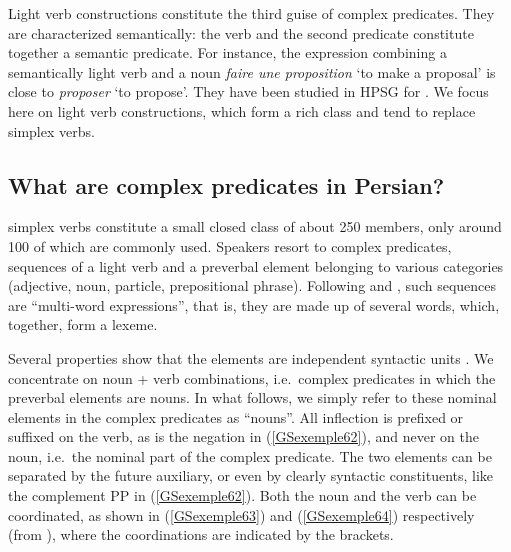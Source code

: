 Light verb constructions constitute the third guise of complex predicates. They are characterized semantically: the verb and the second predicate constitute together a semantic predicate. For instance, the  expression combining a semantically light verb and a noun \emph{faire une proposition} `to make a proposal’ is close to \emph{proposer} `to propose’. They have been studied in HPSG for  \citep{Ryu:93, lee2001argument, choi2001mixed, Kim2016a-u}. We focus here on  light verb constructions, which form a rich class and tend to replace simplex verbs.   
    
\subsection{What are complex predicates in Persian?}\label{GSsection5.1}

 simplex verbs constitute a small closed class of about 250 members, only around 100 of which are commonly used. Speakers resort to complex predicates, sequences of a light verb and a preverbal element belonging to various categories (adjective, noun, particle, prepositional phrase). Following \citet{bonami2010persian} and \citet{pollet2012grammaire}, such sequences are ``multi-word expressions'', that is, they are made up of several words, which, together, form a lexeme. 

Several properties show that the elements are independent syntactic units \citep{Karimi-Doostan97a, Megerdoomian2002a, pollet2012grammaire}. We concentrate on noun + verb combinations, i.e.\ complex predicates in which the preverbal elements are nouns. In what follows, we simply refer to these nominal elements in the complex predicates as ``nouns''.
All inflection is prefixed or suffixed on the verb, as is the negation in (\ref{GSexemple62}), and never on the noun, i.e.\ the nominal part of the complex predicate.
\z
The two elements can be separated by the future auxiliary, or even by clearly syntactic constituents, like the complement PP in (\ref{GSexemple62}). Both the noun and the verb can be coordinated, as shown in (\ref{GSexemple63}) and (\ref{GSexemple64}) respectively (from \citealt[3]{bonami2010persian}), where the coordinations are indicated by the brackets. 
\z

